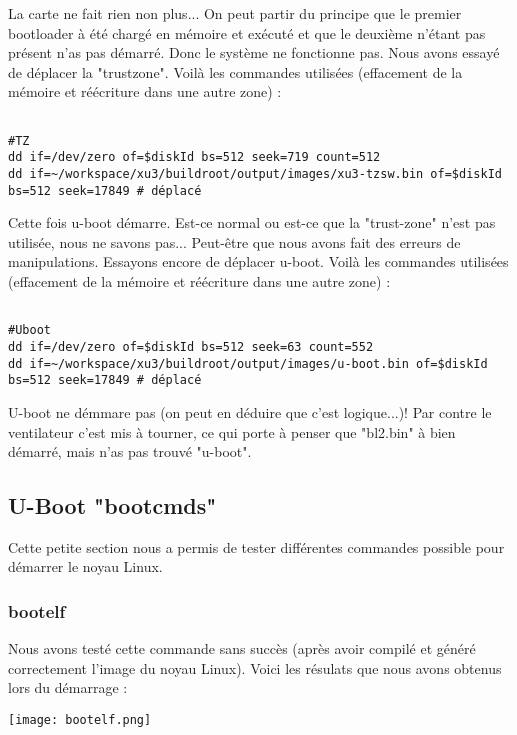 La carte ne fait rien non plus... On peut partir du principe que le premier bootloader à été chargé en mémoire et exécuté et que le deuxième n'étant pas présent n'as pas démarré. Donc le système ne fonctionne pas. 
Nous avons essayé de déplacer la "trustzone". Voilà les commandes utilisées (effacement de la mémoire et réécriture dans une autre zone) : 
\begin{lstlisting}[frame=single,style=Console]  % Start your code-block

#TZ
dd if=/dev/zero of=$diskId bs=512 seek=719 count=512
dd if=~/workspace/xu3/buildroot/output/images/xu3-tzsw.bin of=$diskId bs=512 seek=17849 # déplacé
\end{lstlisting}

Cette fois u-boot démarre. Est-ce normal ou est-ce que la "trust-zone" n'est pas utilisée, nous ne savons pas... Peut-être que nous avons fait des erreurs de manipulations. Essayons encore de déplacer u-boot. 
Voilà les commandes utilisées (effacement de la mémoire et réécriture dans une autre zone) : 

\begin{lstlisting}[frame=single,style=Console]  % Start your code-block

#Uboot
dd if=/dev/zero of=$diskId bs=512 seek=63 count=552
dd if=~/workspace/xu3/buildroot/output/images/u-boot.bin of=$diskId bs=512 seek=17849 # déplacé
\end{lstlisting}

U-boot ne démmare pas (on peut en déduire que c'est logique...)! Par contre le ventilateur c'est mis à tourner, ce qui porte à penser que "bl2.bin" à bien démarré, mais n'as pas trouvé "u-boot".

\pagebreak
\subsection{U-Boot "bootcmds"}
Cette petite section nous a permis de tester différentes commandes possible pour démarrer le noyau Linux.

\subsubsection{bootelf}
Nous avons testé cette commande sans succès (après avoir compilé et généré correctement l'image du noyau Linux). Voici les résulats que nous avons obtenus lors du démarrage :
\begin{center} 
\hspace{15cm}
\texttt{[image: bootelf.png]}
\end{center}
\vspace{0.5cm}

